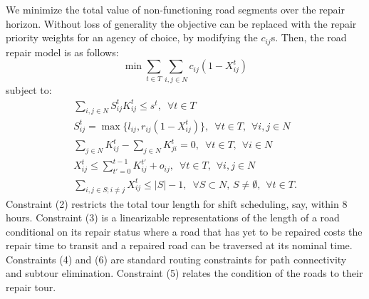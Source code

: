 \documentclass[10pt]{article}
\begin{document}
We minimize the total value of non-functioning road segments over the repair horizon. Without loss of generality the objective can be replaced with the repair priority weights for an agency of choice, by modifying the $c_{ij}$s. Then, the road repair model is as follows:
\begin{equation}
	\min \sum_{t \in T}  \sum_{i,j \in N} c_{ij}(1-X_{ij}^t) 
\end{equation}
subject to:
	\begin{eqnarray}
	\sum_{i,j \in N} S_{ij}^t K_{ij}^t \leq s^t, \hspace{6pt} \forall t\in T \\
	S_{ij}^t = \max \{l_{ij}, r_{ij}(1-X_{ij}^t) \}, \hspace{6pt} \forall t\in T, \hspace{5pt} \forall i,j \in N\\
	\sum_{j \in N} K_{ij}^t - \sum_{j \in N} K_{ji}^t = 0, \hspace{6pt} \forall t\in T, \hspace{5pt} \forall i \in N\\
	X_{ij}^t \le \sum_{t'=0}^{t-1} K_{ij}^{t'} + o_{ij} , \hspace{6pt} \forall t\in T,  \hspace{5pt} \forall i,j \in N\\
	\sum_{i,j \in S; i\neq j} X_{ij}^t \leq |S|-1, \hspace{6pt} \forall S \subset N, \hspace{2pt} S \neq \emptyset, \hspace{5pt} \forall t\in T.
	\end{eqnarray}
Constraint (2) restricts the total tour length for shift scheduling, say, within 8 hours. Constraint (3) is a linearizable representations of the length of a road conditional on its repair status where a road that has yet to be repaired costs the repair time to transit and a repaired road can be traversed at its nominal time. Constraints (4) and (6) are standard routing constraints for path connectivity and subtour elimination. Constraint (5) relates the condition of the roads to their repair tour.
\end{document}
